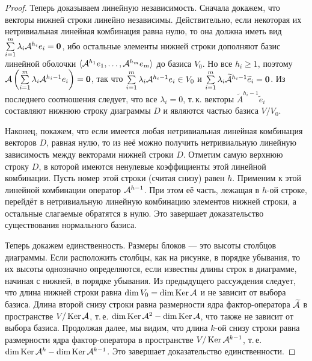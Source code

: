 \begin{proof}
    Теперь доказываем линейную независимость. Сначала докажем, что векторы нижней строки линейно независимы. Действительно, если некоторая их нетривиальная линейная комбинация равна нулю, то она должна иметь вид $\sum\limits_{i = 1}^m\lambda_i\mathcal{A}^{h_i}e_i = \boldsymbol{0}$, ибо остальные элементы нижней строки дополняют базис линейной оболочки $\langle \mathcal{A}^{h_1}e_1, \ldots, \mathcal{A}^{h_m}e_m \rangle$ до базиса $V_0$. Но все $h_i \geqslant 1$, поэтому $\mathcal{A}\left(\sum\limits_{i = 1}^m\lambda_i\mathcal{A}^{h_i - 1}e_i\right) = \boldsymbol{0}$, так что $\sum\limits_{i = 1}^m\lambda_i\mathcal{A}^{h_i - 1}e_i \in V_0$ и $\sum\limits_{i = 1}^m\lambda_i\widetilde{\mathcal{A}}^{h_i - 1}\widetilde{e}_i = \boldsymbol{0}$. Из последнего соотношения следует, что все $\lambda_i = 0$, т.\,к. векторы $\widetilde{A}^{h_i - 1}\widetilde{e}_i$ составляют нижнюю строку диаграммы $D$ и являются частью базиса $V / V_0$.

    Наконец, покажем, что если имеется любая нетривиальная линейная комбинация векторов $D$, равная нулю, то из неё можно получить нетривиальную линейную зависимость между векторами нижней строки $D$. Отметим самую верхнюю строку $D$, в которой имеются ненулевые коэффициенты этой линейной комбинации. Пусть номер этой строки (считая снизу) равен $h$. Применим к этой линейной комбинации оператор $\mathcal{A}^{h - 1}$. При этом её часть, лежащая в $h$-ой строке, перейдёт в нетривиальную линейную комбинацию элементов нижней строки, а остальные слагаемые обратятся в нулю. Это завершает доказательство существования нормального базиса.

    Теперь докажем единственность. Размеры блоков --- это высоты столбцов диаграммы. Если расположить столбцы, как на рисунке, в порядке убывания, то их высоты однозначно определяются, если известны длины строк в диаграмме, начиная с нижней, в порядке убывания. Из предыдущего рассуждения следует, что длина нижней строки равна $\dim V_0 = \dim\operatorname{Ker}\mathcal{A}$ и не зависит от выбора базиса. Длина второй снизу строки равна размерности ядра фактор-оператора $\widetilde{\mathcal{A}}$ в пространстве $V / \operatorname{Ker}\mathcal{A}$, т.\,е. $\dim\operatorname{Ker}\mathcal{A}^2 - \dim\operatorname{Ker}\mathcal{A}$, что также не зависит от выбора базиса. Продолжая далее, мы видим, что длина $k$-ой снизу строки равна размерности ядра фактор-оператора в пространстве $V / \operatorname{Ker}\mathcal{A}^{k - 1}$, т.\,е. $\dim\operatorname{Ker}\mathcal{A}^k - \dim\operatorname{Ker}\mathcal{A}^{k - 1}$. Это завершает доказательство единственности.
\end{proof}

